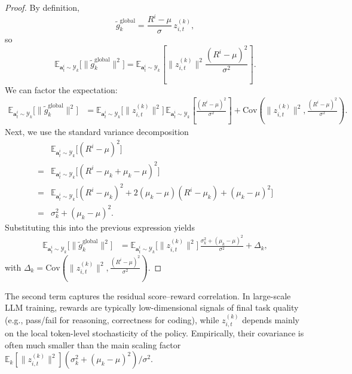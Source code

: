 \documentclass[]{fairmeta}
\theoremstyle{plain}
\theoremstyle{definition}
\theoremstyle{remark}
\begin{document}
\begin{proof}
By definition,
\[
    \tilde{g}_k^{\mathrm{global}}
    = \frac{R^i - \mu}{\sigma}\, z_{i,t}^{(k)},
\]
so
\begin{equation}
    \mathbb{E}_{\bm{a}_t^i\sim \mathcal{Y}_k}\big[\|\tilde{g}_k^{\mathrm{global}}\|^2\big]
    = \mathbb{E}_{\bm{a}_t^i\sim \mathcal{Y}_k}\left[
        \|z_{i,t}^{(k)}\|^2 \frac{(R^i-\mu)^2}{\sigma^2}
      \right].
\end{equation}
We can factor the expectation:
\begin{align}
    \mathbb{E}_{\bm{a}_t^i\sim \mathcal{Y}_k}\big[\|\tilde{g}_k^{\mathrm{global}}\|^2\big]
    &= \mathbb{E}_{\bm{a}_t^i\sim \mathcal{Y}_k}\big[\|z_{i,t}^{(k)}\|^2\big]\,
       \mathbb{E}_{\bm{a}_t^i\sim \mathcal{Y}_k}\left[\frac{(R^i-\mu)^2}{\sigma^2}\right] + \mathrm{Cov}(\|z_{i,t}^{(k)}\|^2,\frac{(R^i-\mu)^2}{\sigma^2}).
\end{align}
Next, we use the standard variance decomposition
\begin{align}
    &\mathbb{E}_{\bm{a}_t^i\sim \mathcal{Y}_k}\big[(R^i - \mu)^2\big] \\
    = &\mathbb{E}_{\bm{a}_t^i\sim \mathcal{Y}_k}\big[(R^i - \mu_k + \mu_k - \mu)^2\big] \\
    = &\mathbb{E}_{\bm{a}_t^i\sim \mathcal{Y}_k}\big[(R^i - \mu_k)^2 + 2(\mu_k - \mu)(R^i - \mu_k) + (\mu_k - \mu)^2\big] \\
    = &\sigma^2_k + (\mu_k-\mu)^2.
\end{align}
Substituting this into the previous expression yields
\begin{align}
    \mathbb{E}_{\bm{a}_t^i\sim \mathcal{Y}_k}\big[\|\tilde{g}_k^{\mathrm{global}}\|^2\big]
    &= \mathbb{E}_{\bm{a}_t^i\sim \mathcal{Y}_k}\big[\|z_{i,t}^{(k)}\|^2\big]\,
       \frac{\sigma^2_k + (\mu_k-\mu)^2}{\sigma^2} + \Delta_k,
\end{align}
with $\Delta_k=\mathrm{Cov}(\|z_{i,t}^{(k)}\|^2,\frac{(R^i-\mu)^2}{\sigma^2})$.
\end{proof}
The second term captures the residual score–reward correlation. In large-scale LLM training, rewards are typically low-dimensional signals of final task quality (e.g., pass/fail for reasoning, correctness for coding), while $z_{i,t}^{(k)}$ depends mainly on the local token-level stochasticity of the policy. Empirically, their covariance is
often much smaller than the main scaling factor $\mathbb{E}_k[\|z_{i,t}^{(k)}\|^2](\sigma_k^2 + (\mu_k - \mu)^2)/\sigma^2$.
\end{document}
